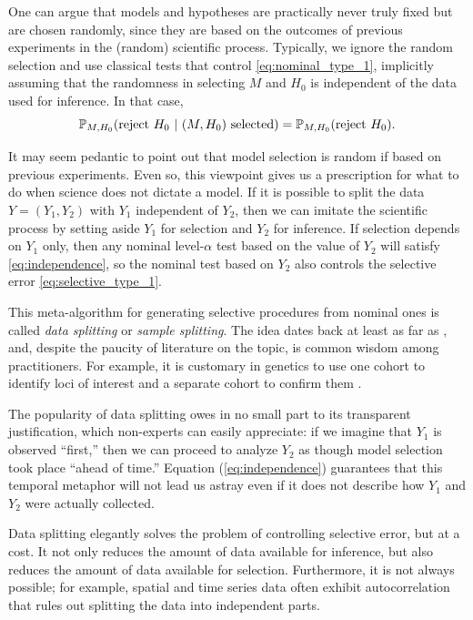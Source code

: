 \documentclass{article}
\theoremstyle{definition}
\newcommand{\sampOrData}{data }
\newcommand{\capSampOrData}{Data }
\begin{document}
One can argue that models and hypotheses are practically never truly fixed but are chosen randomly, since they are based on the outcomes of previous experiments in the (random) scientific process. Typically, we ignore the random selection and use classical tests that control \eqref{eq:nominal_type_1}, implicitly assuming that the randomness in selecting $M$ and $H_0$ is independent of the data used for inference. In that case,
\begin{equation}
\P_{M, H_0}( \text{reject $H_0$} \ |\ \text{$(M, H_0)$ selected} ) = \P_{M, H_0}(\text{reject $H_0$}).
\label{eq:independence}
\end{equation}

It may seem pedantic to point out that model selection is random if based on previous experiments. Even so, this viewpoint gives us a prescription for what to do when science does not dictate a model. If it is possible to split the data $Y = (Y_{1}, Y_{2})$ with $Y_{1}$ independent of $Y_{2}$, then we can imitate the scientific process by setting aside $Y_{1}$ for selection and $Y_{2}$ for inference. If selection depends on $Y_{1}$ only, then any nominal level-$\alpha$ test based on the value of $Y_{2}$ will satisfy \eqref{eq:independence}, so the nominal test based on $Y_{2}$ also controls the selective error \eqref{eq:selective_type_1}.

This meta-algorithm for generating selective procedures from nominal ones is called {\em data splitting} or {\em sample splitting}. The idea dates back at least as far as \citet{cox1975note}, and, despite the paucity of literature on the topic, is common wisdom among practitioners. For example, it is customary in genetics to use one cohort to identify loci of interest and a separate cohort to confirm them \citep{sladek2007genome}.

The popularity of \sampOrData splitting owes in no small part to its transparent justification, which non-experts can easily appreciate: if we imagine that $Y_{1}$ is observed ``first,'' then we can proceed to analyze $Y_{2}$ as though model selection took place ``ahead of time.'' Equation (\ref{eq:independence}) guarantees that this temporal metaphor will not lead us astray even if it does not describe how $Y_{1}$ and $Y_{2}$ were actually collected.

\capSampOrData splitting elegantly solves the problem of controlling selective error, but at a cost. It not only reduces the amount of data available for inference, but also reduces the amount of data available for selection. Furthermore, it is not always possible; for example, spatial and time series data often exhibit autocorrelation that rules out splitting the data into independent parts.
\end{document}

